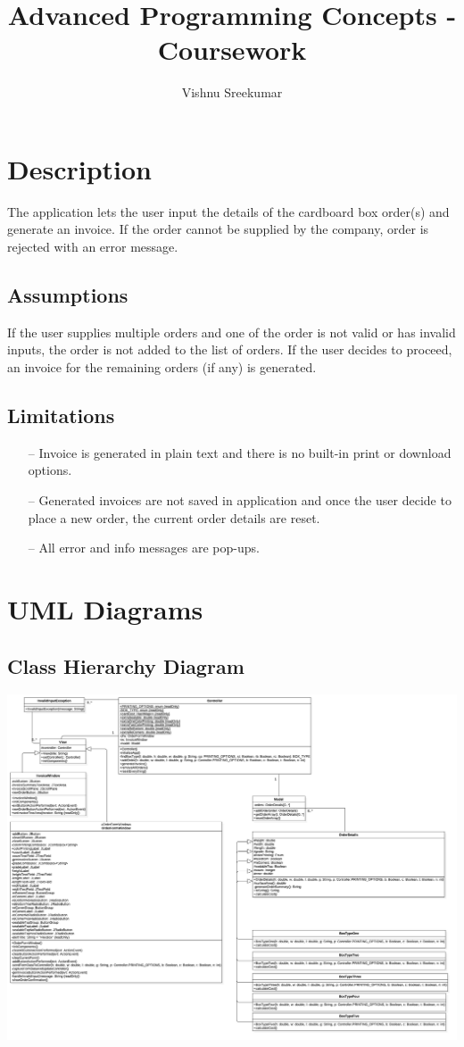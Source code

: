 \documentclass[12pt]{article}
\title{Advanced Programming Concepts - Coursework}
\author{Vishnu Sreekumar}
\date{} %
\begin{document}
\maketitle
\tableofcontents
\newpage

\section{Description}
The application lets the user input the details of the cardboard box order(s) and generate an invoice. If the order cannot be supplied by the company, order is rejected with an error message.

\subsection{Assumptions}
If the user supplies multiple orders and one of the order is not valid or has invalid inputs, the order is not added to the list of orders. If the user decides to proceed, an invoice for the remaining orders (if any) is generated.

\subsection{Limitations}
\begin{enumerate}
	\item[--] Invoice is generated in plain text and there is no built-in print or download options. 
	\item [--] Generated invoices are not saved in application and once the user decide to place a new order, the current order details are reset.
	\item[--] All error and info messages are pop-ups.
\end{enumerate}
\newpage
\section{UML Diagrams}
\subsection{Class Hierarchy Diagram}
\includegraphics[scale=0.13]{./diagrams/ClassHierarchyDiagram.jpg}
\end{document}

